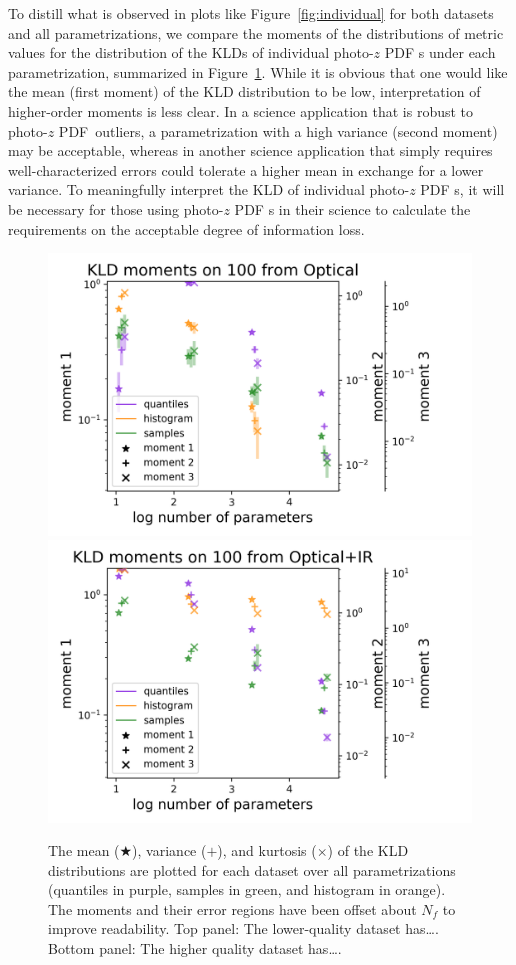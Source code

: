 \documentclass[\docopts]{\docclass}
\newcommand{\pz}{photo-$z$ PDF\xspace}
\begin{document}
To distill what is observed in plots like Figure~\ref{fig:individual} for both
datasets and all parametrizations, we compare the moments of the distributions
of metric values for the distribution of the KLDs of individual \pz s under
each parametrization, summarized in Figure~\ref{fig:moments}.  While it is
obvious that one would like the mean (first moment) of the KLD distribution to
be low, interpretation of higher-order moments is less clear.  In a science
application that is robust to \pz\ outliers, a parametrization with a high
variance (second moment) may be acceptable, whereas in another science
application that simply requires well-characterized errors could tolerate a
higher mean in exchange for a lower variance.  To meaningfully interpret the
KLD of individual \pz s, it will be necessary for those using \pz s in their
science to calculate the requirements on the acceptable degree of information
loss.

\begin{figure}
  \includegraphics[width=0.9\columnwidth]{lsst_moments.png}\\
  \includegraphics[width=0.9\columnwidth]{graham_moments.png}
  \caption{The mean ($\bigstar$), variance ($+$), and kurtosis ($\times$) of
the KLD distributions are plotted for each dataset over all parametrizations
(quantiles in purple, samples in green, and histogram in orange).  The moments
and their error regions have been offset about $N_{f}$ to improve readability.
Top panel: The lower-quality dataset has\dots.  Bottom panel: The higher quality
dataset has\dots.
  \label{fig:moments}}
\end{figure}
\end{document}
